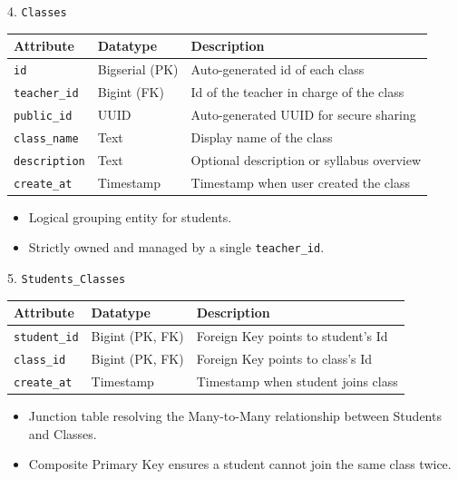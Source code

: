 \documentclass[aspectratio=169, 10pt]{beamer}
\begin{document}
\begin{frame}{4. \texttt{Classes}}
    \centering
    \small
    \begin{tabular}{|l|l|p{8cm}|}
        \hline
        \textbf{Attribute} & \textbf{Datatype} & \textbf{Description} \\ \hline
        \texttt{id} & Bigserial (PK) & Auto-generated id of each class\\ \hline
        \texttt{teacher\_id} & Bigint (FK) & Id of the teacher in charge of the class\\ \hline
        \texttt{public\_id} & UUID & Auto-generated UUID for secure sharing\\ \hline
        \texttt{class\_name} & Text & Display name of the class\\ \hline
        \texttt{description} & Text & Optional description or syllabus overview\\ \hline
        \texttt{create\_at} & Timestamp & Timestamp when user created the class\\ \hline
    \end{tabular}
    \vspace{0.3cm}
    \begin{itemize}
        \item Logical grouping entity for students.
        \item Strictly owned and managed by a single \texttt{teacher\_id}.
    \end{itemize}
\end{frame}


\begin{frame}{5. \texttt{Students\_Classes}}
    \centering
    \small
    \begin{tabular}{|l|l|p{8cm}|}
        \hline
        \textbf{Attribute} & \textbf{Datatype} & \textbf{Description} \\ \hline
        \texttt{student\_id} & Bigint (PK, FK) & Foreign Key points to student's Id\\ \hline
        \texttt{class\_id} & Bigint (PK, FK) & Foreign Key points to class's Id\\ \hline
        \texttt{create\_at} & Timestamp & Timestamp when student joins class\\ \hline
    \end{tabular}
    \vspace{0.3cm}
    \begin{itemize}
        \item Junction table resolving the Many-to-Many relationship between Students and Classes.
        \item Composite Primary Key ensures a student cannot join the same class twice.
    \end{itemize}
\end{frame}
\end{document}
